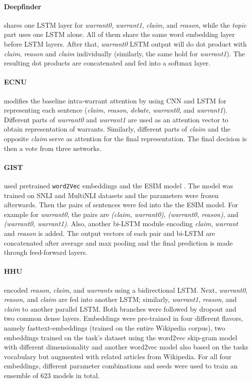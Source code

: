 \paragraph{Deepfinder}
shares one LSTM layer for \emph{warrant0}, \emph{warrant1}, \emph{claim}, and \emph{reason}, while the \emph{topic} part uses one LSTM alone. All of them share the same word embedding layer before LSTM layers. After that, \emph{warrant0} LSTM output will do dot product with \emph{claim}, \emph{reason} and \emph{claim} individually (similarly, the same hold for \emph{warrant1}). The resulting dot products are concatenated and fed into a softmax layer.


\paragraph{ECNU}
modifies the baseline intra-warrant attention \cite{habernal.et.al.2018.NAACL.arct} by using CNN and LSTM for representing each sentence (\emph{claim}, \emph{reason}, \emph{debate}, \emph{warrant0}, and \emph{warrant1}). Different parts of \emph{warrant0} and \emph{warrant1} are used as an attention vector to obtain representation of warrants. Similarly, different parts of \emph{claim} and the opposite \emph{claim} serve as attention for the final representation. The final decision is then a vote from three networks.


\paragraph{GIST} used pretrained \texttt{word2Vec} embeddings and the ESIM model \cite{Chen.et.al.2017.ACL.ESIM}. The model was trained on SNLI \cite{Bowman.et.al.2015} and MultiNLI \cite{nangia-EtAl:2017:RepEval} datasets and the parameters were frozen afterwards. Then the pairs of sentences were fed into the the ESIM model. For example for \emph{warrant0}, the pairs are \emph{(claim, warrant0)}, \emph{(warrant0, reason)}, and \emph{(warrant0, warrant1)}. Also, another bi-LSTM module encoding \emph{claim}, \emph{warrant} and \emph{reason} is added. The output vectors of each pair and bi-LSTM are concatenated after average and max pooling and the final prediction is made through feed-forward layers.


\paragraph{HHU}
encoded \emph{reason}, \emph{claim}, and \emph{warrants} using a bidirectional LSTM. Next, \emph{warrant0}, \emph{reason}, and \emph{claim} are fed into another LSTM; similarly, \emph{warrant1}, \emph{reason}, and \emph{claim} to another parallel LSTM. Both branches were followed by dropout and two common dense layers. Embeddings were pre-trained in four different flavors, namely fasttext-embeddings (trained on the entire Wikipedia corpus), two embeddings trained on the task's dataset using the word2vec skip-gram model with different dimensionality and another word2vec model also based on the tasks vocabulary but augmented with related articles from Wikipedia. For all four embeddings, different parameter combinations and seeds were used to train an ensemble of 623 models in total.

